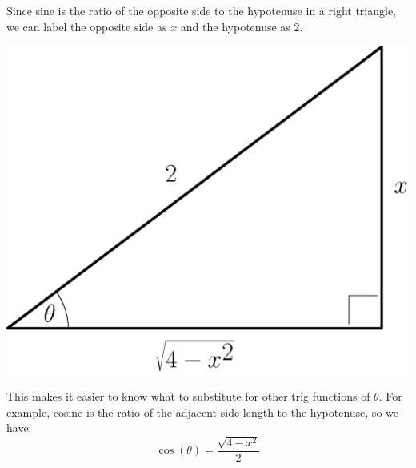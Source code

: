 Since sine is the ratio of the opposite side to the hypotenuse in a right triangle, we can label the opposite side as $x$ and the hypotenuse as 2. 
\begin{center}
\includegraphics[scale=0.4]{ChapterAntidiff/Figures/sinsubtri}
\end{center}
This makes it easier to know what to substitute for other trig functions of $\theta$.  For example, cosine is the ratio of the adjacent side length to the hypotenuse, so we have:
$$\cos(\theta)=\frac{\sqrt{4-x^2}}{2} $$


